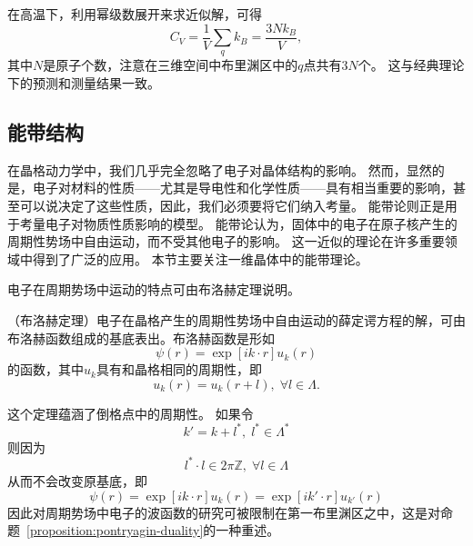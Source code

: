 在高温下，利用幂级数展开来求近似解，可得
\begin{equation}
    C_V = \frac{1}{V} \sum_q k_B = \frac{3 N k_B}{V},
\end{equation}
其中$N$是原子个数，注意在三维空间中布里渊区中的$q$点共有$3N$个。
这与经典理论下的预测和测量结果一致。

\subsection{能带结构}
在晶格动力学中，我们几乎完全忽略了电子对晶体结构的影响。
然而，显然的是，电子对材料的性质——尤其是导电性和化学性质——具有相当重要的影响，甚至可以说决定了这些性质，因此，我们必须要将它们纳入考量。
能带论则正是用于考量电子对物质性质影响的模型。
能带论认为，固体中的电子在原子核产生的周期性势场中自由运动，而不受其他电子的影响。
这一近似的理论在许多重要领域中得到了广泛的应用。
本节主要关注一维晶体中的能带理论。

电子在周期势场中运动的特点可由布洛赫定理说明。
\begin{theorem}
    （布洛赫定理）电子在晶格产生的周期性势场中自由运动的薛定谔方程的解，可由布洛赫函数组成的基底表出。布洛赫函数是形如
    \begin{equation}
        \psi(r) = \exp[i k \cdot r] u_k(r)
    \end{equation}
    的函数，其中$u_k$具有和晶格相同的周期性，即
    \begin{equation}
        u_k(r) = u_k(r + l), \; \forall l \in \Lambda.
    \end{equation}
\end{theorem}

这个定理蕴涵了倒格点中的周期性。
如果令
\begin{equation}
    k' = k + l^*, \; l^* \in \Lambda^*
\end{equation}
则因为
\begin{equation}
    l^* \cdot l \in 2 \pi \mathbb Z, \; \forall l \in \Lambda
\end{equation}
从而不会改变原基底，即
\begin{equation}
    \psi(r) = \exp[i k \cdot r] u_k(r) = \exp[i k' \cdot r] u_{k'}(r)
\end{equation}
因此对周期势场中电子的波函数的研究可被限制在第一布里渊区之中，这是对命题~\ref{proposition:pontryagin-duality}的一种重述。

